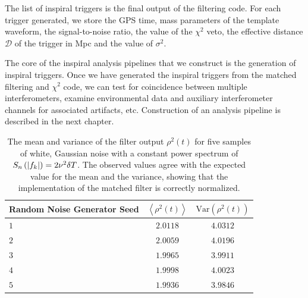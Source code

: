 The list of inspiral triggers is the final output of the filtering code. For
each trigger generated, we store the GPS time, mass parameters of the
template waveform, the signal-to-noise ratio, the value of the $\chi^2$ veto, the
effective distance $\mathcal{D}$ of the trigger in Mpc and the value of
$\sigma^2$.

The core of the inspiral analysis pipelines that we construct is the generation of
inspiral triggers. Once we have generated the inspiral triggers from the
matched filtering and $\chi^2$ code, we can test for coincidence
between multiple interferometers, examine environmental data and auxiliary
interferometer channels for associated artifacts, etc.  Construction of an
analysis pipeline is described in the next chapter.


\begin{table}[p]
\label{t:normresults}
\begin{center}
\begin{tabular}{l|c|c}
Random Noise Generator Seed& $\left\langle \rho^2(t) \right\rangle$ & $\mathrm{Var}( \rho^2(t) )$\\
\hline
$1$ & $2.0118$ & $4.0312$ \\
$2$ & $2.0059$ & $4.0196$ \\
$3$ & $1.9965$ & $3.9911$ \\
$4$ & $1.9998$ & $4.0023$ \\
$5$ & $1.9936$ & $3.9846$ \\
\end{tabular}
\end{center}
\caption[Mean and Variance of the Matched Filter Output for Gaussian Noise]{%
The mean and variance of the filter output $\rho^2(t)$ for five samples of
white, Gaussian noise with a constant power spectrum of $S_n\left(\left|f_{k}\right|\right) =
2\nu^2\delta T$. The observed values agree with the expected value for the
mean and the variance, showing that the implementation of the matched
filter is correctly normalized.
}
\end{table}

\newpage


